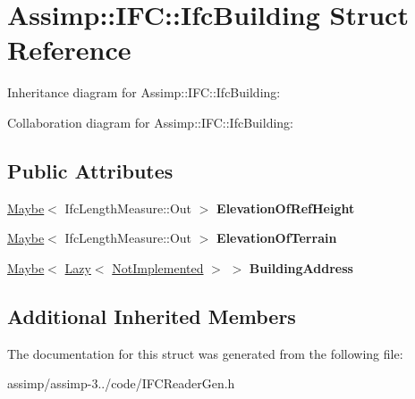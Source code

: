 \hypertarget{struct_assimp_1_1_i_f_c_1_1_ifc_building}{\section{Assimp\+:\+:I\+F\+C\+:\+:Ifc\+Building Struct Reference}
\label{struct_assimp_1_1_i_f_c_1_1_ifc_building}
}


Inheritance diagram for Assimp\+:\+:I\+F\+C\+:\+:Ifc\+Building\+:


Collaboration diagram for Assimp\+:\+:I\+F\+C\+:\+:Ifc\+Building\+:
\subsection*{Public Attributes}
\begin{DoxyCompactItemize}
\item 
\hypertarget{struct_assimp_1_1_i_f_c_1_1_ifc_building_a95f457e4cace24c20634dd74c36c67fe}{\hyperlink{struct_assimp_1_1_s_t_e_p_1_1_maybe}{Maybe}$<$ Ifc\+Length\+Measure\+::\+Out $>$ {\bfseries Elevation\+Of\+Ref\+Height}}\label{struct_assimp_1_1_i_f_c_1_1_ifc_building_a95f457e4cace24c20634dd74c36c67fe}

\item 
\hypertarget{struct_assimp_1_1_i_f_c_1_1_ifc_building_aee63b718bb463384e38bce445779540b}{\hyperlink{struct_assimp_1_1_s_t_e_p_1_1_maybe}{Maybe}$<$ Ifc\+Length\+Measure\+::\+Out $>$ {\bfseries Elevation\+Of\+Terrain}}\label{struct_assimp_1_1_i_f_c_1_1_ifc_building_aee63b718bb463384e38bce445779540b}

\item 
\hypertarget{struct_assimp_1_1_i_f_c_1_1_ifc_building_a4eeaca34e76588d091861f0aa1cb5c81}{\hyperlink{struct_assimp_1_1_s_t_e_p_1_1_maybe}{Maybe}$<$ \hyperlink{struct_assimp_1_1_s_t_e_p_1_1_lazy}{Lazy}$<$ \hyperlink{struct_assimp_1_1_i_f_c_1_1_not_implemented}{Not\+Implemented} $>$ $>$ {\bfseries Building\+Address}}\label{struct_assimp_1_1_i_f_c_1_1_ifc_building_a4eeaca34e76588d091861f0aa1cb5c81}

\end{DoxyCompactItemize}
\subsection*{Additional Inherited Members}


The documentation for this struct was generated from the following file\+:\begin{DoxyCompactItemize}
\item 
assimp/assimp-\/3../code/I\+F\+C\+Reader\+Gen.\+h\end{DoxyCompactItemize}
